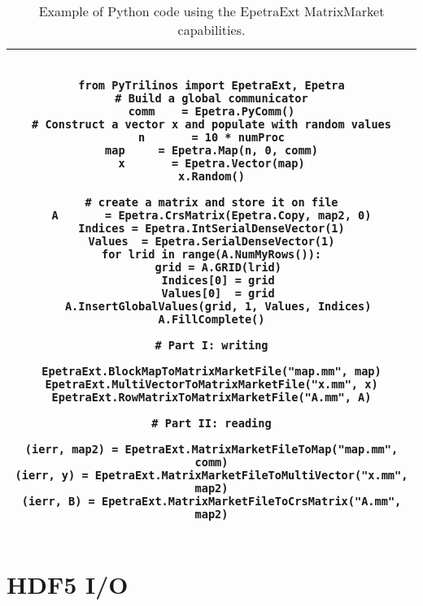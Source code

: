 \documentclass[11pt,relax]{SANDreport}
\begin{document}
\begin{sidewaystable}
\begin{center}
\begin{tabular}{| c |}
\hline
\begin{minipage}{17cm}
\begin{verbatim}

from PyTrilinos import EpetraExt, Epetra
# Build a global communicator
comm    = Epetra.PyComm()
# Construct a vector x and populate with random values
n       = 10 * numProc
map     = Epetra.Map(n, 0, comm)
x       = Epetra.Vector(map)
x.Random()

# create a matrix and store it on file
A       = Epetra.CrsMatrix(Epetra.Copy, map2, 0)
Indices = Epetra.IntSerialDenseVector(1)
Values  = Epetra.SerialDenseVector(1)
for lrid in range(A.NumMyRows()):
  grid = A.GRID(lrid)
  Indices[0] = grid
  Values[0]  = grid
  A.InsertGlobalValues(grid, 1, Values, Indices)
A.FillComplete()

# Part I: writing

EpetraExt.BlockMapToMatrixMarketFile("map.mm", map)
EpetraExt.MultiVectorToMatrixMarketFile("x.mm", x)
EpetraExt.RowMatrixToMatrixMarketFile("A.mm", A)

# Part II: reading

(ierr, map2) = EpetraExt.MatrixMarketFileToMap("map.mm", comm)
(ierr, y) = EpetraExt.MatrixMarketFileToMultiVector("x.mm", map2)
(ierr, B) = EpetraExt.MatrixMarketFileToCrsMatrix("A.mm", map2)

\end{verbatim}
\end{minipage} \\
    \hline
\end{tabular}
\caption{Example of Python code using the EpetraExt MatrixMarket
  capabilities.}
\label{fig:python}
\end{center}
\end{sidewaystable}

\section{HDF5 I/O}
\label{sec:hdf5}
\end{document}
